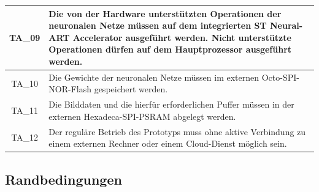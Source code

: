 \begin{longtable}{|c|p{}|}
    \hline
    TA\_09 & Die von der Hardware unterstützten Operationen der neuronalen Netze müssen auf dem integrierten ST Neural-ART Accelerator ausgeführt werden. Nicht unterstützte Operationen dürfen auf dem Hauptprozessor ausgeführt werden. \\
    \hline
    TA\_10 & Die Gewichte der neuronalen Netze müssen im externen Octo-SPI-NOR-Flash gespeichert werden. \\
    \hline
    TA\_11 & Die Bilddaten und die hierfür erforderlichen Puffer müssen in der externen Hexadeca-SPI-PSRAM abgelegt werden. \\
    \hline
    TA\_12 & Der reguläre Betrieb des Prototyps muss ohne aktive Verbindung zu einem externen Rechner oder einem Cloud-Dienst möglich sein. \\
    \hline
\end{longtable}

\subsection{Randbedingungen}\label{sub:randbedingungen}

